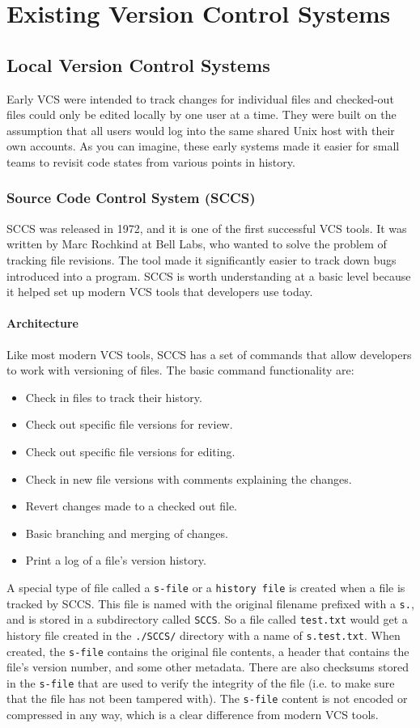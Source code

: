 \section{Existing Version Control Systems}
\subsection{Local Version Control Systems}
Early VCS were intended to track changes for individual files and checked-out files could only be edited locally by one user at a time. They were built on the assumption that all users would log into the same shared Unix host with their own accounts. As you can imagine, these early systems made it easier for small teams to revisit code states from various points in history.
\subsubsection{Source Code Control System (SCCS)}
SCCS was released in 1972, and it is one of the first successful VCS tools. It was written by Marc Rochkind at Bell Labs, who wanted to solve the problem of tracking file revisions. The tool made it significantly easier to track down bugs introduced into a program. SCCS is worth understanding at a basic level because it helped set up modern VCS tools that developers use today.
\paragraph{Architecture}
Like most modern VCS tools, SCCS has a set of commands that allow developers to work with versioning of files. The basic command functionality are:
\begin{itemize}
    \item Check in files to track their history.
    \item Check out specific file versions for review.
    \item Check out specific file versions for editing.
    \item Check in new file versions with comments explaining the changes.
    \item Revert changes made to a checked out file.
    \item Basic branching and merging of changes.
    \item Print a log of a file's version history.
\end{itemize}
A special type of file called a \lstinline{s-file} or a \lstinline{history file} is created when a file is tracked by SCCS. This file is named with the original filename prefixed with a \lstinline{s.}, and is stored in a subdirectory called \lstinline{SCCS}. So a file called \lstinline{test.txt} would get a history file created in the \lstinline{./SCCS/} directory with a name of \lstinline{s.test.txt}. When created, the \lstinline{s-file} contains the original file contents, a header that contains the file's version number, and some other metadata. There are also checksums stored in the \lstinline{s-file} that are used to verify the integrity of the file (i.e. to make sure that the file has not been tampered with). The \lstinline{s-file} content is not encoded or compressed in any way, which is a clear difference from modern VCS tools.
